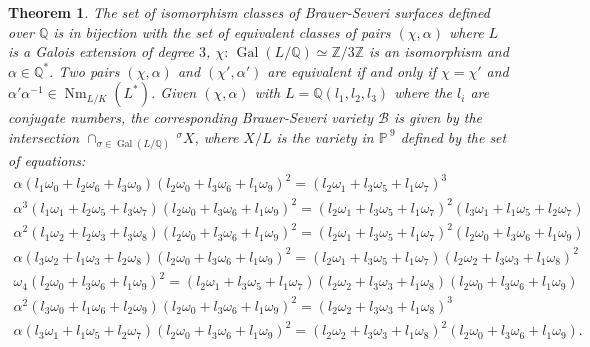 \documentclass[a4paper,10pt]{amsart}
\theoremstyle{plain}
\newtheorem{theorem}{Theorem}[section]
\theoremstyle{definition}
\theoremstyle{remark}
\numberwithin{equation}{section}
\begin{document}
\begin{theorem}\label{thm-eq2Q}
The set of isomorphism classes of Brauer-Severi surfaces defined over $\mathbb{Q}$ is in bijection with the set of equivalent classes of pairs $(\chi,\alpha)$ where $L$ is a Galois extension of degree $3$, $\chi:\,\operatorname{Gal}(L/\mathbb{Q})\simeq\mathbb{Z}/3\mathbb{Z}$ is an isomorphism and $\alpha\in\mathbb{Q}^*$. Two pairs $(\chi,\alpha)$ and $(\chi',\alpha')$ are equivalent if and only if $\chi=\chi'$ and $\alpha'\alpha^{-1}\in\operatorname{Nm}_{L/K}(L^*)$. Given $(\chi,\alpha)$ with $L=\mathbb{Q}(l_1,l_2,l_3)$ where the $l_i$ are conjugate numbers, the corresponding Brauer-Severi variety $\mathcal{B}$ is given by 
the intersection $\cap_{\sigma\in\operatorname{Gal}(L/{\mathbb{Q}})}\,^{\sigma}X$, where $X/L$ is the variety in ${\mathbb{P}\,}^9$ defined by the set of equations:
\small
$$
\begin{array}{c}
\alpha(l_1\omega_0+l_2\omega_6+l_3\omega_9)(l_2\omega_0+l_3\omega_6+l_1\omega_9)^2=(l_2\omega_1+l_3\omega_5+l_1\omega_7)^3\\
\alpha^3(l_1\omega_1+l_2\omega_5+l_3\omega_7)(l_2\omega_0+l_3\omega_6+l_1\omega_9)^2=(l_2\omega_1+l_3\omega_5+l_1\omega_7)^2(l_3\omega_1+l_1\omega_5+l_2\omega_7)\\
\alpha^2(l_1\omega_2+l_2\omega_3+l_3\omega_8)(l_2\omega_0+l_3\omega_6+l_1\omega_9)^2=(l_2\omega_1+l_3\omega_5+l_1\omega_7)^2(l_2\omega_0+l_3\omega_6+l_1\omega_9)\\
\alpha(l_3\omega_2+l_1\omega_3+l_2\omega_8)(l_2\omega_0+l_3\omega_6+l_1\omega_9)^2=(l_2\omega_1+l_3\omega_5+l_1\omega_7)(l_2\omega_2+l_3\omega_3+l_1\omega_8)^2\\
\omega_4(l_2\omega_0+l_3\omega_6+l_1\omega_9)^2=(l_2\omega_1+l_3\omega_5+l_1\omega_7)(l_2\omega_2+l_3\omega_3+l_1\omega_8)(l_2\omega_0+l_3\omega_6+l_1\omega_9)\\
\alpha^2(l_3\omega_0+l_1\omega_6+l_2\omega_9)(l_2\omega_0+l_3\omega_6+l_1\omega_9)^2=(l_2\omega_2+l_3\omega_3+l_1\omega_8)^3\\
\alpha(l_3\omega_1+l_1\omega_5+l_2\omega_7)(l_2\omega_0+l_3\omega_6+l_1\omega_9)^2=(l_2\omega_2+l_3\omega_3+l_1\omega_8)^2(l_2\omega_0+l_3\omega_6+l_1\omega_9).
\end{array}
$$
\normalsize
\end{theorem}
\end{document}

